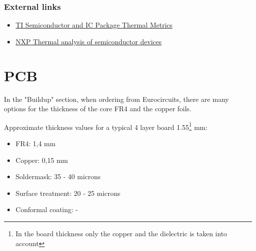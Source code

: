 \documentclass[final]{cubedoc}
\begin{document}
	
	\subsubsection{External links}
	\begin{itemize}
		\item \href{https://web.archive.org/web/20200818132243/https://www.ti.com/lit/an/spra953c/spra953c.pdf}{TI Semiconductor and IC Package Thermal Metrics}
		\item \href{https://web.archive.org/web/20200818123847/https://www.nxp.com/docs/en/white-paper/BasicThermalWP.pdf}{NXP Thermal analysis of semiconductor devices}
	\end{itemize}
	
	
	\section{PCB}
	
	In the "Buildup" section, when ordering from Eurocircuits, there are many options for the thickness of the core FR4 and the copper foils.
	
	Approximate thickness values for a typical 4 layer board 1.55\footnote{In the board thickness only the copper and the dielectric is taken into account} mm:
	\begin{itemize}
		\item FR4:  1,4 mm
		\item Copper:  0,15 mm
		\item Soldermask: 35 - 40 microns
		\item Surface treatment: 20 - 25 microns
		\item Conformal coating: -
	\end{itemize}
	
\end{document}
